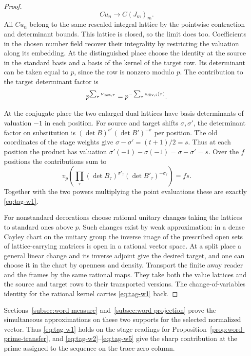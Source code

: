 \begin{proof}
\[
  C u_n\to C(J_m)_m.
\]
 All \(C u_n\) belong to the same
rescaled integral lattice by the pointwise contraction and
determinant bounds. This lattice is closed, so the limit does
too. Coefficients in the chosen number field recover their
integrality by restricting the valuation along its embedding. At the
distinguished place choose the identity at the source in the
standard basis and a basis of the kernel of the target row.
Its determinant can be taken equal to \(p\), since the row is
nonzero modulo \(p\). The contribution to the target determinant
factor is 
\[
  p^{\sum_\tau\nu_{{\rm last},\tau}}
=p^{-\sum_\tau s_{{\rm div},i}(\tau)}.
\]

At the conjugate place the two enlarged dual lattices have
basis determinants of valuation \(-1\) in each position. For
source and target shifts \(\sigma,\sigma'\), the determinant
factor on substitution is \((\det B)^{\sigma'}
(\det B')^{-\sigma}\) per position. The old coordinates of
the stage weights give \(\sigma-\sigma'=(t+1)/2=s\).
Thus at each position the product has valuation
\(\sigma'(-1)-\sigma(-1)=\sigma-\sigma'=s\).
Over the \(f\) positions the contributions sum to
\[
       v_p\!\left(\prod_\tau(\det B_\tau)^{\sigma'_\tau}
                                 (\det B'_\tau)^{-\sigma_\tau}\right)
                       = fs.
\] Together with the
two powers multiplying the point evaluations these are exactly
\eqref{eq:tag-w1}.

For nonstandard decorations choose rational unitary changes
taking the lattices to standard ones above \(p\). Such changes
exist by weak approximation: in a dense Cayley chart on the
unitary group the inverse image of the prescribed open sets of
lattice-carrying matrices is open in a rational vector space.
At a split place a general linear change and its inverse adjoint
give the desired target, and one can choose it in the chart by
openness and density. Transport the finite away reader and the
frames by the same rational maps. They take both the value
lattices and the source and target rows to their transported
versions. The change-of-variables identity for the rational
kernel carries \eqref{eq:tag-w1} back.
\end{proof}

Sections~\ref{subsec:word-measure} and~\ref{subsec:word-projection}
prove the simultaneous approximations on these two supports
for the selected normalized vector. Thus \eqref{eq:tag-w1} holds on
the stage readings for Proposition~\ref{prop:word-prime-transfer}, and \eqref{eq:tag-w2}--\eqref{eq:tag-w5} give the sharp
contribution at the prime assigned to the sequence on the trace-zero column.
